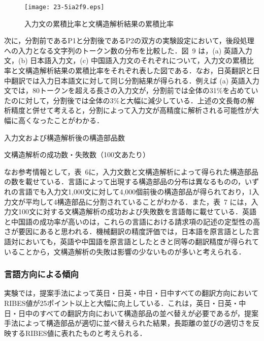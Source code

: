 \documentclass[japanese]{jnlp_1.4}
\begin{document}
\begin{figure}[p]
\begin{center}
\texttt{[image: 23-5ia2f9.eps]}
\end{center}
\caption{入力文の累積比率と文構造解析結果の累積比率}
\label{fig09}
\end{figure}

次に，分割前であるP1と分割後であるP2の双方の実験設定において，後段処理への入力となる文字列のトークン数の分布を比較した．図~9 は，(a) 英語入力文，(b) 日本語入力文，(c) 
中国語入力文のそれぞれについて，入力文の累積比率と文構造解析結果の累積比率をそれぞれ表した図である．なお，日英翻訳と日中翻訳では入力日本語文に対して同じ分割結果が得られる．例えば 
(a) 
英語入力文では，80トークンを超える長さの入力文が，分割前では全体の31{\%}を占めていたのに対して，分割後では全体の3{\%}と大幅に減少している．上述の文長毎の解析精度と併せて考えると，分割によって入力文が高精度に解析される可能性が大幅に高くなったことがわかる．

\begin{table}[b]
\caption{入力文および構造解析後の構造部品数}
\label{tab06}

\end{table}
\begin{table}[b]
\caption{文構造解析の成功数・失敗数（100文あたり）}
\label{tab07}

\end{table}

なお参考情報として，表~6に，入力文数と文構造解析によって得られた構造部品の数を載せている．言語によって出現する構造部品の分布は異なるものの，いずれの言語でも入力文1,000文に対して4,000個前後の構造部品が得られており，1入力文が平均して4構造部品に分割されていることがわかる．また，表~7 には，入力文100文に対する文構造解析の成功および失敗数を言語毎に載せている．英語と中国語の成功率が高いのは，これらの言語における請求項の記述の定型性の高さが要因にあると思われる．機械翻訳の精度評価では，日本語を原言語とした言語対においても，英語や中国語を原言語としたときと同等の翻訳精度が得られていることから，文構造解析の失敗は影響の少ないものが多いと考えられる．


\subsubsection{言語方向による傾向}

実験では，提案手法によって英日・日英・中日・日中すべての翻訳方向においてRIBES値が25ポイント以上と大幅に向上している．これは，英日・日英・中日・日中のすべての翻訳方向において構造部品の並べ替えが必要であるが，提案手法によって構造部品が適切に並べ替えられた結果，長距離の並びの適切さを反映するRIBES値に表れたものと考えられる．
\end{document}
